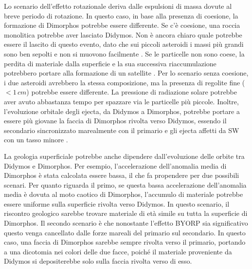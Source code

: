 \documentclass[a4paper,11pt,openright]{book}
\begin{document}
Lo scenario dell'effetto rotazionale deriva dalle espulsioni di massa dovute al breve periodo di rotazione. In questo caso, in base alla presenza di coesione, la formazione di Dimorphos potrebbe essere differente. Se c'è coesione, una roccia monolitica potrebbe aver lasciato Didymos. Non è ancora chiaro quale potrebbe essere il lascito di questo evento, dato che sui piccoli asteroidi i massi più grandi sono ben sepolti e non si muovono facilmente \citep{daly_hemispherical_2020}. Se le particelle non sono coese, la perdita di materiale dalla superficie e la sua successiva riaccumulazione potrebbero portare alla formazione di un satellite \citep{walsh_spin-up_2012}. Per lo scenario senza coesione, i due asteroidi avrebbero la stessa composizione, ma la presenza di regolite fine ($<1\,cm$) potrebbe essere differente. La pressione di radiazione solare potrebbe aver avuto abbastanza tempo per spazzare via le particelle più piccole. Inoltre, l'evoluzione orbitale degli ejecta, da Didymos a Dimorphos, potrebbe portare a essere più giovane la faccia di Dimorphos rivolta verso Didymos, essendo il secondario sincronizzato marealmente con il primario e gli ejecta affetti da SW con un tasso minore \citep{agrusa_excited_2021}.

La geologia superficiale potrebbe anche dipendere dall'evoluzione delle orbite tra Didymos e Dimorphos. Per esempio, l'accelerazione dell'anomalia media di Dimorphos è stata calcolata essere bassa, il che fa propendere per due possibili scenari. Per quanto riguarda il primo, se questa bassa accelerazione dell'anomalia media è dovuta al moto caotico di Dimorphos, l'accumulo di materiale potrebbe essere uniforme sulla superficie rivolta verso Didymos. In questo scenario, il riscontro geologico sarebbe trovare materiale di età simile su tutta la superficie di Dimorphos. Il secondo scenario è che nonostante l'effetto BYORP sia significativo questo venga cancellato dalle forze mareali del primario sul secondario. In questo caso, una faccia di Dimorphos sarebbe sempre rivolta verso il primario, portando a una dicotomia nei colori delle due facce, poiché il materiale proveniente da Didymos si depositerebbe solo sulla faccia rivolta verso di esso.
\end{document}
